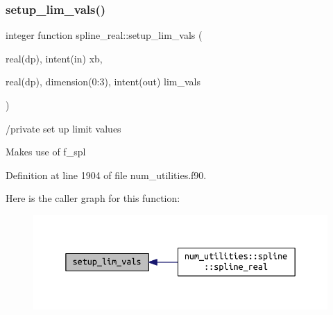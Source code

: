 \subsubsection{\texorpdfstring{setup\+\_\+lim\+\_\+vals()}{setup\_lim\_vals()}}
{\footnotesize\ttfamily integer function spline\+\_\+real\+::setup\+\_\+lim\+\_\+vals (\begin{DoxyParamCaption}\item[{real(dp), intent(in)}]{xb,  }\item[{real(dp), dimension(0\+:3), intent(out)}]{lim\+\_\+vals }\end{DoxyParamCaption})}



/private set up limit values 

Makes use of f\+\_\+spl 

Definition at line 1904 of file num\+\_\+utilities.\+f90.

Here is the caller graph for this function\+:\nopagebreak
\begin{figure}[H]
\begin{center}
\leavevmode
\includegraphics[width=350pt]{num__utilities_8f90_a41f0ec23e08348e7498587997f483a00_icgraph}
\end{center}
\end{figure}
